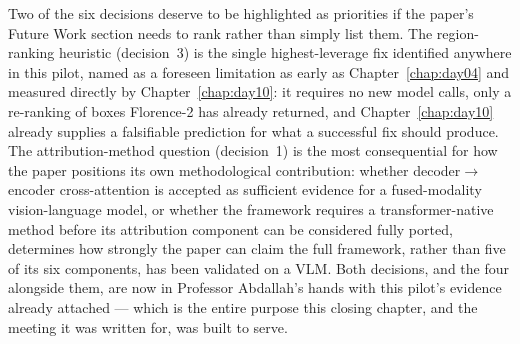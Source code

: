 Two of the six decisions deserve to be highlighted as priorities if the paper's Future Work
section needs to rank rather than simply list them. The region-ranking heuristic (decision~3) is
the single highest-leverage fix identified anywhere in this pilot, named as a foreseen
limitation as early as Chapter~\ref{chap:day04} and measured directly by Chapter~\ref{chap:day10}:
it requires no new model calls, only a re-ranking of boxes Florence-2 has already returned, and
Chapter~\ref{chap:day10} already supplies a falsifiable prediction for what a successful fix
should produce. The attribution-method question (decision~1) is the most consequential for how
the paper positions its own methodological contribution: whether decoder$\to$encoder
cross-attention is accepted as sufficient evidence for a fused-modality vision-language model,
or whether the framework requires a transformer-native method before its attribution component
can be considered fully ported, determines how strongly the paper can claim the full framework,
rather than five of its six components, has been validated on a VLM. Both decisions, and the
four alongside them, are now in Professor Abdallah's hands with this pilot's evidence already
attached --- which is the entire purpose this closing chapter, and the meeting it was written
for, was built to serve.

